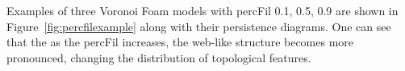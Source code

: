 \documentclass[12pt]{article}
\newcommand{\figref}[1]{Figure~\ref{#1}}
\begin{document}


Examples of three Voronoi Foam models with percFil 0.1, 0.5, 0.9 are shown in \figref{fig:percfilexample} along with their persistence diagrams. One can see that the as the percFil increases, the web-like structure becomes more pronounced, changing the distribution of topological features.
\end{document}
